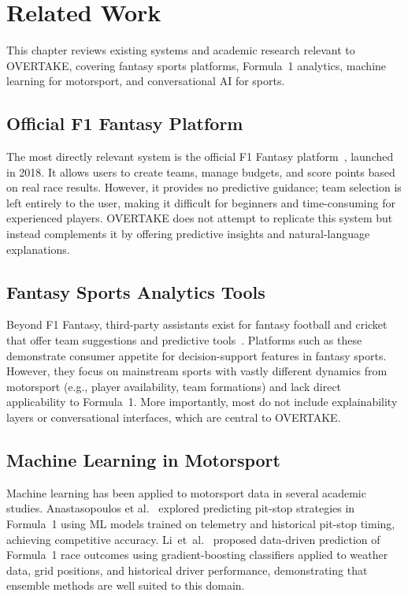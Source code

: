 \documentclass[12pt, a4paper, oneside]{report}
\begin{document}
\chapter{Related Work}

This chapter reviews existing systems and academic research relevant to
OVERTAKE, covering fantasy sports platforms, Formula~1 analytics, machine
learning for motorsport, and conversational AI for sports.

\section{Official F1 Fantasy Platform}

The most directly relevant system is the official F1 Fantasy
platform~\cite{f1Fantasy}, launched in 2018. It allows users to create teams,
manage budgets, and score points based on real race results. However, it
provides no predictive guidance; team selection is left entirely to the user,
making it difficult for beginners and time-consuming for experienced players.
OVERTAKE does not attempt to replicate this system but instead complements it
by offering predictive insights and natural-language explanations.

\section{Fantasy Sports Analytics Tools}

Beyond F1 Fantasy, third-party assistants exist for fantasy football and cricket
that offer team suggestions and predictive tools~\cite{fantasyFootballHub}.
Platforms such as these demonstrate consumer appetite for decision-support
features in fantasy sports. However, they focus on mainstream sports with
vastly different dynamics from motorsport (e.g., player availability, team
formations) and lack direct applicability to Formula~1. More importantly, most
do not include explainability layers or conversational interfaces, which are
central to OVERTAKE.

\section{Machine Learning in Motorsport}

Machine learning has been applied to motorsport data in several academic
studies. Anastasopoulos et al.~\cite{anastasopoulosPitStop2021} explored
predicting pit-stop strategies in Formula~1 using ML models trained on
telemetry and historical pit-stop timing, achieving competitive accuracy.
Li~et~al.~\cite{liRaceOutcomes2020} proposed data-driven prediction of
Formula~1 race outcomes using gradient-boosting classifiers applied to
weather data, grid positions, and historical driver performance, demonstrating
that ensemble methods are well suited to this domain.
\end{document}
